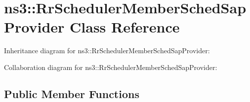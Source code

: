 \hypertarget{classns3_1_1RrSchedulerMemberSchedSapProvider}{}\section{ns3\+:\+:Rr\+Scheduler\+Member\+Sched\+Sap\+Provider Class Reference}
\label{classns3_1_1RrSchedulerMemberSchedSapProvider}


Inheritance diagram for ns3\+:\+:Rr\+Scheduler\+Member\+Sched\+Sap\+Provider\+:


Collaboration diagram for ns3\+:\+:Rr\+Scheduler\+Member\+Sched\+Sap\+Provider\+:
\subsection*{Public Member Functions}
